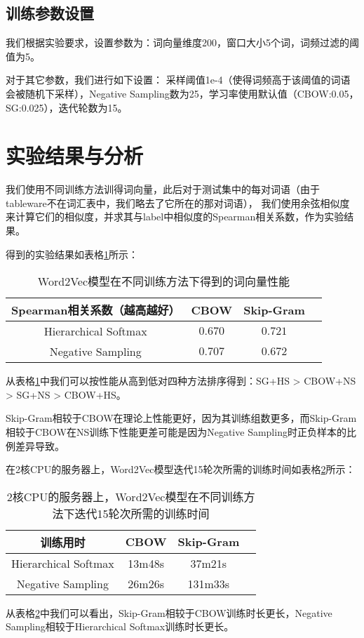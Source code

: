 \documentclass{article}
\begin{document}
\subsection{训练参数设置}
我们根据实验要求，设置参数为：词向量维度200，窗口大小5个词，词频过滤的阈值为5。

对于其它参数，我们进行如下设置：
采样阈值1e-4（使得词频高于该阈值的词语会被随机下采样），Negative Sampling数为25，学习率使用默认值（CBOW:0.05，SG:0.025），迭代轮数为15。



\section{实验结果与分析}


我们使用不同训练方法训得词向量，此后对于测试集中的每对词语（由于tableware不在词汇表中，我们略去了它所在的那对词语），
我们使用余弦相似度来计算它们的相似度，并求其与label中相似度的Spearman相关系数，作为实验结果。

得到的实验结果如表格\ref{tab:results}所示：
\begin{table}[htbp]
  \caption{Word2Vec模型在不同训练方法下得到的词向量性能}
  \label{tab:results}
  \vspace{5pt}
  \centering
  \begin{tabular}{cccc}
    \toprule
    Spearman相关系数（越高越好） & CBOW    & Skip-Gram \\
    \midrule
    Hierarchical Softmax         & $0.670$ & $0.721$   \\
    \midrule
    Negative Sampling            & $0.707$ & $0.672$   \\
    \bottomrule
  \end{tabular}
\end{table}

从表格\ref{tab:results}中我们可以按性能从高到低对四种方法排序得到：SG+HS > CBOW+NS > SG+NS > CBOW+HS。

Skip-Gram相较于CBOW在理论上性能更好，因为其训练组数更多，而Skip-Gram相较于CBOW在NS训练下性能更差可能是因为Negative Sampling时正负样本的比例差异导致。


在2核CPU的服务器上，Word2Vec模型迭代15轮次所需的训练时间如表格\ref{tab:time}所示：
\begin{table}[htbp]
  \caption{2核CPU的服务器上，Word2Vec模型在不同训练方法下迭代15轮次所需的训练时间}
  \label{tab:time}
  \vspace{5pt}
  \centering
  \begin{tabular}{cccc}
    \toprule
    训练用时             & CBOW   & Skip-Gram \\
    \midrule
    Hierarchical Softmax & 13m48s & 37m21s    \\
    \midrule
    Negative Sampling    & 26m26s & 131m33s   \\
    \bottomrule
  \end{tabular}
\end{table}

从表格\ref{tab:time}中我们可以看出，Skip-Gram相较于CBOW训练时长更长，Negative Sampling相较于Hierarchical Softmax训练时长更长。
\end{document}
